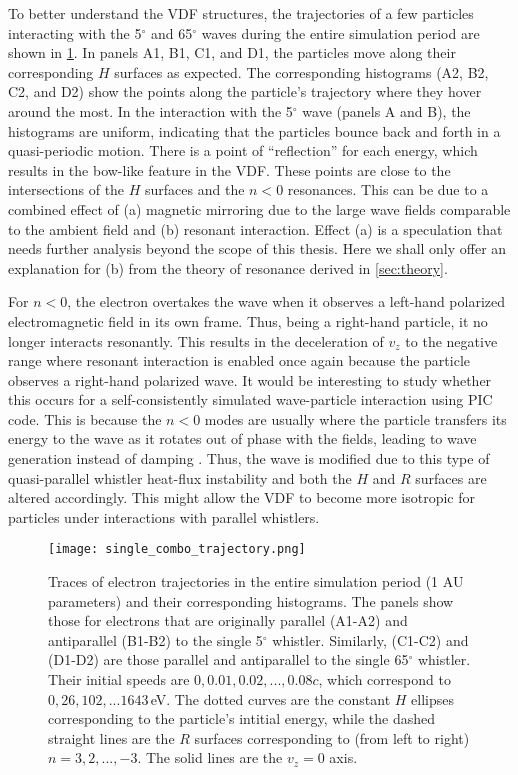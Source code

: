 To better understand the VDF structures, the
trajectories of a few particles interacting with the 5$^\circ$ and
65$^\circ$ waves during the entire simulation period are shown in \cref{fig:single_O5_1_AU}. In panels A1, B1, C1, and D1, the particles move along their corresponding $H$
surfaces as expected. The corresponding histograms (A2, B2, C2, and D2) show the
points along the particle's trajectory where they hover around the most. In the
interaction with the 5$^\circ$ wave (panels A and B), the histograms are uniform, indicating that the particles bounce back and forth in a quasi-periodic motion. There is a point of ``reflection'' for each energy, which results in the bow-like feature in the VDF. These points are close to the intersections of the $H$ surfaces and the $n<0$ resonances. This can be due to a combined effect of (a) magnetic mirroring due to the large wave fields comparable to the ambient field and (b) resonant interaction. Effect (a) is a speculation that needs further analysis beyond the scope of this thesis. Here we shall only offer an explanation for (b) from the theory of resonance derived in \cref{sec:theory}.

For $n<0$, the electron overtakes the wave when it observes a left-hand polarized electromagnetic field in its own frame. Thus, being a right-hand particle, it no longer interacts resonantly. This results in the deceleration of $v_z$ to the negative range where resonant interaction is enabled once again because the particle observes a right-hand polarized wave. It would be interesting to study whether this occurs for a self-consistently simulated wave-particle interaction using PIC code. This is because the $n<0$ modes are usually where the particle transfers its energy to the wave as it rotates out of phase with the fields, leading to wave generation instead of damping \citep{Tsurutani1997}. Thus, the wave is modified due to this type of quasi-parallel whistler heat-flux instability \citep{RobergClark2019,Micera2020} and both the $H$ and $R$ surfaces are altered accordingly. This might allow the VDF to become more isotropic for particles under interactions with parallel whistlers.

\begin{figure}[hbtp]
    \centering
    \texttt{[image: single\_combo\_trajectory.png]}
    \caption{Traces of electron trajectories in the entire simulation period
        (1 AU parameters) and
        their corresponding histograms. The panels show those for electrons that are originally parallel (A1-A2) and antiparallel (B1-B2) to the
        single 5$^\circ$ whistler. Similarly, (C1-C2) and (D1-D2) are those
        parallel and antiparallel to the single 65$^\circ$ whistler. Their
    initial speeds are $0,0.01,0.02,...,0.08c$, which correspond to
$0,26,102,...1643$\,\si{eV}. The dotted curves are the constant $H$ ellipses
corresponding to the particle's intitial energy, while the dashed straight lines
are the $R$ surfaces corresponding to (from left to right) $n=3,2,...,-3$. The
solid lines are the $v_z=0$ axis.}
        \label{fig:single_O5_1_AU}
\end{figure}


